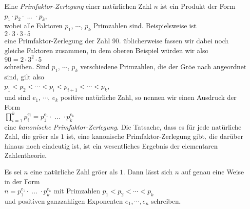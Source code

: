 Eine \emph{Primfaktor-Zerlegung} einer nat\"{u}rlichen Zahl $n$ ist ein Produkt der Form
\\[0.2cm]
\hspace*{1.3cm}
$p_1 \cdot p_2 \cdot\; \dots \;\cdot p_k$,
\\[0.2cm]
wobei alle Faktoren $p_1$, $\cdots$, $p_k$ Primzahlen sind.  Beispielsweise ist
\\[0.2cm]
\hspace*{1.3cm}
$2 \cdot 3 \cdot 3 \cdot 5$
\\[0.2cm]
eine Primfaktor-Zerlegung der Zahl 90.  \"{u}blicherweise fassen wir dabei noch gleiche Faktoren
zusammen, in dem oberen Beispiel w\"{u}rden wir also
\\[0.2cm]
\hspace*{1.3cm}
$90 = 2 \cdot 3^2 \cdot 5$
\\[0.2cm]
schreiben.  Sind $p_1$, $\cdots$, $p_k$ verschiedene Primzahlen, die der Gr\"{o}\3e nach angeordnet sind,
gilt also
\\[0.2cm]
\hspace*{1.3cm}
$p_1 < p_2 < \cdots < p_{i} < p_{i+1} < \cdots < p_k$,
\\[0.2cm]
und sind $e_1$, $\cdots$, $e_k$ positive nat\"{u}rliche Zahl, so nennen wir einen Ausdruck der Form
\\[0.2cm]
\hspace*{1.3cm}
$\prod\limits_{i=1}^k  p_i^{e_i} = p_1^{e_1} \cdot \;\dots\; \cdot p_k^{e_k}$
\\[0.2cm]
eine \emph{kanonische Primfaktor-Zerlegung}.  Die Tatsache, dass es f\"{u}r jede nat\"{u}rliche Zahl, die
gr\"{o}\3er als $1$ ist, eine kanonische Primfaktor-Zerlegung gibt, die dar\"{u}ber hinaus noch eindeutig
ist,  ist ein wesentliches Ergebnis der elementaren Zahlentheorie.


\begin{Theorem}
\label{theorem:fundamental-arithmetik} \lb
  Es sei $n$ eine nat\"{u}rliche Zahl gr\"{o}\3er als $1$.  Dann l\"{a}sst sich $n$ auf genau eine Weise in der Form
  \\[0.2cm]
  \hspace*{1.3cm}
  $n = p_1^{e_1} \cdot \;\dots\; \cdot p_k^{e_k}$ \quad mit Primzahlen $p_1 < p_2 < \cdots < p_k$
  \\[0.2cm]
  und positiven ganzzahligen Exponenten $e_1, \cdots, e_n$ schreiben.
\end{Theorem}

